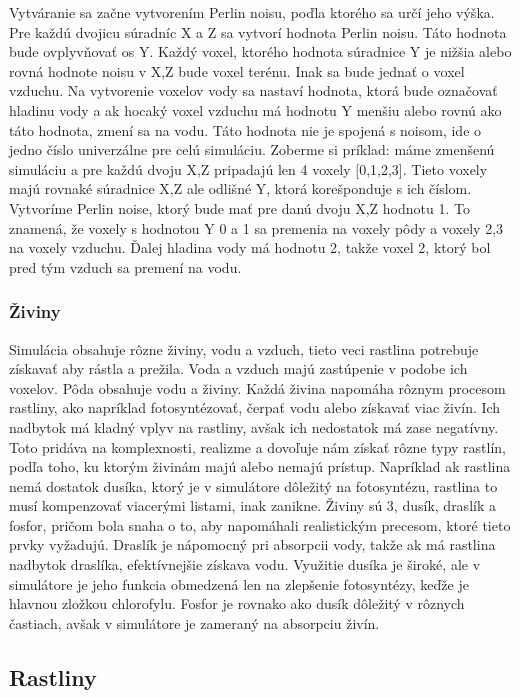 \documentclass[12pt]{article}
\begin{document}
Vytváranie sa začne vytvorením Perlin noisu, poďla ktorého sa určí jeho výška.
Pre každú dvojicu súradníc X a Z sa vytvorí hodnota Perlin noisu. Táto hodnota
bude ovplyvňovať os Y. Každý voxel, ktorého hodnota súradnice Y je nižšia alebo
rovná hodnote noisu v X,Z bude voxel terénu. Inak sa bude jednať o voxel
vzduchu. Na vytvorenie voxelov vody sa nastaví hodnota, ktorá bude označovať
hladinu vody a ak hocaký voxel vzduchu má hodnotu Y menšiu alebo rovnú ako táto
hodnota, zmení sa na vodu. Táto hodnota nie je spojená s noisom, ide o jedno
číslo univerzálne pre celú simuláciu. Zoberme si príklad: máme zmenšenú
simuláciu a pre každú dvoju X,Z pripadajú len 4 voxely [0,1,2,3]. Tieto voxely
majú rovnaké súradnice X,Z ale odlišné Y, ktorá korešponduje s ich číslom.
Vytvoríme Perlin noise, ktorý bude mať pre danú dvoju X,Z hodnotu 1. To
znamená, že voxely s hodnotou Y 0 a 1 sa premenia na voxely pôdy a voxely 2,3
na voxely vzduchu. Ďalej hladina vody má hodnotu 2, takže voxel 2, ktorý bol
pred tým vzduch sa premení na vodu.

\subsubsection{Živiny}

Simulácia obsahuje rôzne živiny, vodu a vzduch, tieto veci rastlina potrebuje
získavať aby rástla a prežila. Voda a vzduch majú zastúpenie v podobe ich
voxelov. Pôda obsahuje vodu a živiny. Každá živina napomáha rôznym procesom
rastliny, ako napríklad fotosyntézovať, čerpať vodu alebo získavať viac živín.
Ich nadbytok má kladný vplyv na rastliny, avšak ich nedostatok má zase
negatívny. Toto pridáva na komplexnosti, realizme a dovoľuje nám získať rôzne
typy rastlín, podľa toho, ku ktorým živinám majú alebo nemajú prístup.
Napríklad ak rastlina nemá dostatok dusíka, ktorý je v simulátore dôležitý
na fotosyntézu, rastlina to musí kompenzovať viacerými listami, inak zanikne.
Živiny sú 3, dusík, draslík a fosfor, pričom bola snaha o to, aby napomáhali
realistickým precesom, ktoré tieto prvky vyžadujú. Draslík je nápomocný pri
absorpcii vody, takže ak má rastlina nadbytok draslíka, efektívnejšie získava
vodu. Využitie dusíka je široké, ale v simulátore je jeho funkcia obmedzená
len na zlepšenie fotosyntézy, keďže je hlavnou zložkou chlorofylu. Fosfor je
rovnako ako dusík dôležitý v rôznych častiach, avšak v simulátore je zameraný
na absorpciu živín.

\subsection{Rastliny}
\end{document}
